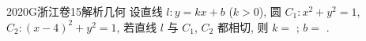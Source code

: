 
\begin{problem}{2020}{G}{浙江卷}{15}{解析几何}
设直线 $ l:y=kx+b $ ($ k>0 $), 圆 $ C_1:x^2+y^2=1 $, $ C_2:(x-4)^2+y^2=1 $, 若直线 $ l $ 与 $ C_1 $, $ C_2 $ 都相切, 则 $ k= $ \underline{\hspace{4em}}; $ b= $ \underline{\hspace{4em}}.
\end{problem}

\begin{answer}

\end{answer}

\begin{solutions}

\end{solutions}